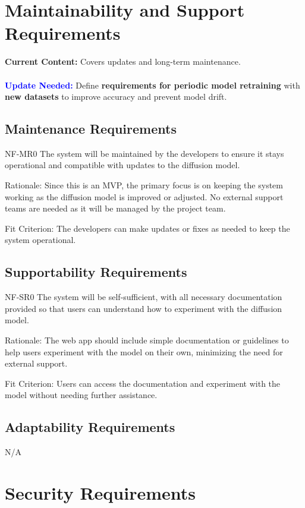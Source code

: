 \documentclass[12pt]{article}
\begin{document}
\section{Maintainability and Support Requirements}

\textbf{Current Content:} Covers updates and long-term maintenance. \\
\\
\textbf{\textcolor{blue}{Update Needed:}} Define \textbf{requirements for periodic model retraining} with \textbf{new datasets} to improve accuracy and prevent model drift.

\subsection{Maintenance Requirements}
NF-MR0 The system will be maintained by the developers to ensure it stays operational and 
compatible with updates to the diffusion model.

Rationale: Since this is an MVP, the primary focus is on keeping the system working as the 
diffusion model is improved or adjusted. No external support teams are needed as it will be 
managed by the project team.

Fit Criterion: The developers can make updates or fixes as needed to keep the system operational.

\subsection{Supportability Requirements}
NF-SR0 The system will be self-sufficient, with all necessary documentation provided so that users 
can understand how to experiment with the diffusion model.

Rationale: The web app should include simple documentation or guidelines to help users experiment
 with the model on their own, minimizing the need for external support.

Fit Criterion: Users can access the documentation and experiment with the model without needing 
further assistance.

\subsection{Adaptability Requirements}
N/A

\section{Security Requirements}
\end{document}

